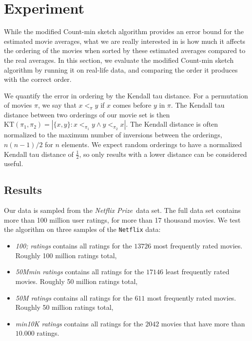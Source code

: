 \section{Experiment}
While the modified Count-min sketch algorithm provides an error bound for the
estimated movie averages, what we are really interested in is how much it
affects the ordering of the movies when sorted by these estimated averages
compared to the real averages. In this section, we evaluate the modified
Count-min sketch algorithm by running it on real-life data, and comparing the
order it produces with the correct order. 

We quantify the error in ordering by the Kendall tau distance. For a permutation
of movies $\pi$, we say that $x <_\pi y$ if $x$ comes before $y$ in $\pi$. The
Kendall tau distance between two orderings of our movie set is then $\mathrm{KT}
\left(\pi_1,\pi_2\right) = \left|\{x,y\}: x <_{\pi_1} y \wedge y <_{\pi_2}
x\right|$. The Kendall distance is often normalized to the maximum number of
inversions between the orderings, $n(n-1)/2$ for $n$ elements. We expect random
orderings to have a normalized Kendall tau distance of $\frac{1}{2}$, so
only results with a lower distance can be considered useful.

\subsection{Results}
Our data is sampled from the \textit{Netflix
Prize}\footnotemark \ data set.
The full data set contains more than 100 million user ratings, for more than 17
thousand movies.
We test the algorithm on three samples of the \texttt{Netflix} data:

\begin{itemize}
	\item \textit{100; ratings} contains all ratings for the $13726$ most
		frequently rated movies. Roughly 100 million ratings total,
	\item \textit{50Mmin ratings} contains all ratings for the $17146$ least
		frequently rated movies. Roughly 50 million ratings total,
	\item \textit{50M ratings} contains all ratings for the $611$ most
		frequently rated movies. Roughly 50 million ratings total,
	\item \textit{min10K ratings} contains all ratings for the $2042$ movies that have more
		than $10.000$ ratings.

\end{itemize}

